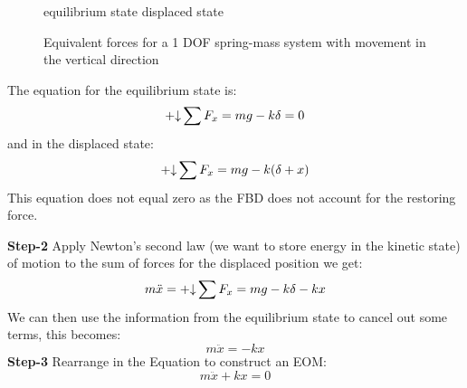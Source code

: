 \documentclass[12pt,letter]{article}
\begin{document}
\begin{example}
\begin{figure}[H]
				equilibrium state \hspace{3.6cm} displaced state
				\caption{Equivalent forces for a 1 DOF spring-mass system with movement in the vertical direction}
			\end{figure}		
			\noindent The equation for the equilibrium state is:
			\begin{equation}
				\mathbin{+\mathord\downarrow} \sum F_x = mg - k\delta = 0
			\end{equation}
			and in the displaced state:
			\begin{equation}
				\mathbin{+\mathord\downarrow} \sum F_x =mg -k(\delta + x)
			\end{equation}	
			This equation does not equal zero as the FBD does not account for the restoring force.	
			
			\noindent \textbf{Step-2} Apply Newton's second law (we want to store energy in the kinetic state) of motion to the sum of forces for the displaced position we get: 		
			\begin{equation}
				m\ddot{x} = \mathbin{+\mathord\downarrow} \sum F_x =mg -k\delta -kx
			\end{equation}
			We can then use the information from the equilibrium state to cancel out some terms, this becomes:
			\begin{equation}
				m\ddot{x} = -kx
			\end{equation}				
			\textbf{Step-3} Rearrange in the Equation to construct an EOM: 					
			\begin{equation}
				m\ddot{x} + kx = 0
			\end{equation}			
		\end{example}		
\end{document}
